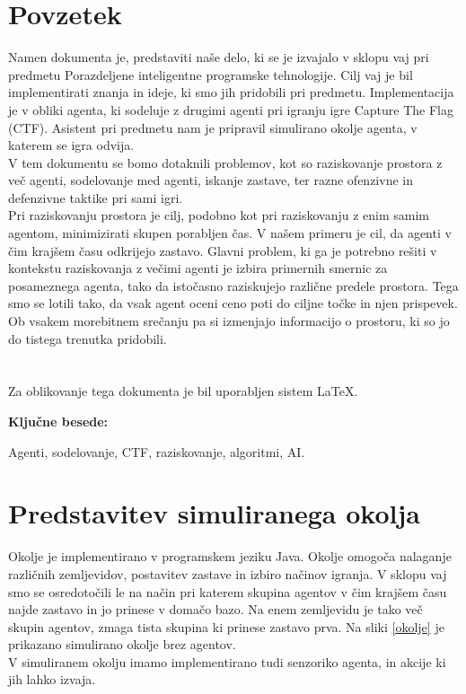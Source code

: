 \documentclass[12pt,a4paper,openany]{book}
\begin{document}
\chapter*{Povzetek}

Namen dokumenta je, predstaviti naše delo, ki se je izvajalo v sklopu vaj pri predmetu
 Porazdeljene inteligentne programske tehnologije. Cilj vaj je bil implementirati znanja
 in ideje, ki smo jih pridobili pri predmetu. Implementacija je v obliki agenta, ki sodeluje
 z drugimi agenti pri igranju igre Capture The Flag (CTF). Asistent pri predmetu nam je pripravil
 simulirano okolje agenta, v katerem se igra odvija.
\\
V tem dokumentu se bomo dotaknili problemov, kot so raziskovanje prostora z več agenti, sodelovanje med agenti, 
iskanje zastave, ter razne ofenzivne in defenzivne taktike pri sami igri.
\\
Pri raziskovanju prostora je cilj, podobno kot pri raziskovanju z enim samim agentom, minimizirati skupen porabljen čas.
 V našem primeru je cil, da agenti v čim krajšem času odkrijejo zastavo. Glavni problem, ki ga je potrebno rešiti v kontekstu
 raziskovanja z večimi agenti je izbira primernih smernic za posameznega agenta, tako da istočasno raziskujejo različne predele 
prostora. Tega smo se lotili tako, da vsak agent oceni ceno poti do ciljne točke in njen prispevek. Ob vsakem morebitnem srečanju 
pa si izmenjajo informacijo o prostoru, ki so jo do tistega trenutka pridobili.\\
\\
\\
Za oblikovanje tega dokumenta je bil uporabljen sistem \LaTeX.

\vspace{1.3cm}
\noindent
{\large \bf Ključne besede:}

\vspace{0.5cm}
\noindent
Agenti, sodelovanje, CTF, raziskovanje, algoritmi, AI.




\chapter{Predstavitev simuliranega okolja}
Okolje je implementirano v programskem jeziku Java. Okolje omogoča nalaganje različnih zemljevidov,
 postavitev zastave in izbiro načinov igranja. V sklopu vaj smo se osredotočili le na način pri katerem
 skupina agentov v čim krajšem času najde zastavo in jo prinese v domačo bazo. Na enem zemljevidu je tako
 več skupin agentov, zmaga tista skupina ki prinese zastavo prva. Na sliki \ref{okolje} je prikazano
simulirano okolje brez agentov. 
\\
V simuliranem okolju imamo implementirano tudi senzoriko agenta, in akcije ki jih lahko izvaja.\\
\end{document}
